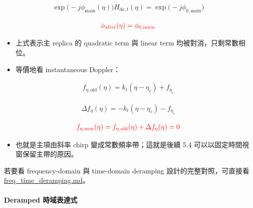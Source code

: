 \documentclass[10pt]{article}
\providecommand{\tightlist}{%
  \setlength{\itemsep}{0pt}\setlength{\parskip}{0pt}}
\begin{document}
\begin{equation}
\begin{aligned}
\exp\biggl( -j\phi_{\mathrm{main}}(\eta) \biggr)H_{\mathrm{de},t}(\eta)=\exp\biggl( -j\phi_{0,\mathrm{main}} \biggr)
\end{aligned}
\end{equation}

\begin{equation}
\begin{aligned}
{\color{red}{\phi_{\mathrm{after}}(\eta)=\phi_{0,\mathrm{main}}}}
\end{aligned}
\end{equation}

\begin{itemize}
\tightlist
\item
  上式表示主 replica 的 quadratic term 與 linear term
  均被對消，只剩常數相位。
\item
  等價地看 instantaneous Doppler：
\end{itemize}

\begin{equation}
\begin{aligned}
f_{\eta,\mathrm{old}}(\eta)=k_t(\eta-\eta_c)+f_{\eta_c}
\end{aligned}
\end{equation}

\begin{equation}
\begin{aligned}
\Delta f_\eta(\eta)=-k_t(\eta-\eta_c)-f_{\eta_c}
\end{aligned}
\end{equation}

\begin{equation}
\begin{aligned}
{\color{red}{f_{\eta,\mathrm{new}}(\eta)=f_{\eta,\mathrm{old}}(\eta)+\Delta f_\eta(\eta)=0}}
\end{aligned}
\end{equation}

\begin{itemize}
\tightlist
\item
  也就是主項由斜率 chirp 變成常數頻率帶；這就是後續 5.4
  可以以固定時間視窗保留主帶的原因。
\end{itemize}

若要看 frequency-domain 與 time-domain deramping
設計的完整對照，可直接看
\href{./freq_time_deramping.md}{freq\_time\_deramping.md}。

\hypertarget{deramped-ux6642ux57dfux8868ux9054ux5f0f}{%
\paragraph{Deramped
時域表達式}\label{deramped-ux6642ux57dfux8868ux9054ux5f0f}}
\end{document}
